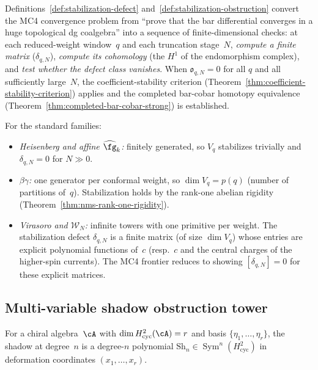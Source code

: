 \begin{remark}
\label{rem:nms-mc4-finite-linear-algebra}%
%
Definitions~\ref{def:stabilization-defect}
and~\ref{def:stabilization-obstruction} convert the MC4 convergence
problem from ``prove that the bar differential converges in a huge
topological dg coalgebra'' into a sequence of finite-dimensional
checks: at each reduced-weight window~$q$ and each truncation
stage~$N$, \emph{compute a finite matrix} ($\delta_{q,N}$),
\emph{compute its cohomology} (the $H^1$ of the endomorphism
complex), and \emph{test whether the defect class vanishes}. When
$\mathfrak{o}_{q,N} = 0$ for all $q$ and all sufficiently large~$N$,
the coefficient-stability criterion
(Theorem~\ref{thm:coefficient-stability-criterion}) applies and the
completed bar-cobar homotopy equivalence
(Theorem~\ref{thm:completed-bar-cobar-strong}) is established.

For the standard families:
\begin{itemize}
\item \emph{Heisenberg and affine $\widehat{\fg}_k$:} finitely
 generated, so $V_q$ stabilizes trivially and
 $\delta_{q,N} = 0$ for $N \gg 0$.
\item \emph{$\beta\gamma$:} one generator per conformal weight,
 so $\dim V_q = p(q)$ (number of partitions of~$q$).
 Stabilization holds by the rank-one abelian rigidity
 (Theorem~\ref{thm:nms-rank-one-rigidity}).
\item \emph{Virasoro and $\mathcal{W}_N$:} infinite towers with
 one primitive per weight. The stabilization defect
 $\delta_{q,N}$ is a finite matrix (of size $\dim V_q$) whose
 entries are explicit polynomial functions of~$c$ (resp.\ $c$
 and the central charges of the higher-spin currents). The
 MC4 frontier reduces to showing $[\delta_{q,N}] = 0$ for these
 explicit matrices.
\end{itemize}
\end{remark}


\subsection{Multi-variable shadow obstruction tower}\label{sec:nms-multivariable-shadow}

For a chiral algebra~$\cA$ with $\dim H^2_{\mathrm{cyc}}(\cA) = r$ and
basis $\{\eta_1, \ldots, \eta_r\}$, the shadow at degree~$n$ is a
degree-$n$ polynomial
$\mathrm{Sh}_n \in \operatorname{Sym}^n(H^2_{\mathrm{cyc}})$ in
deformation coordinates $(x_1, \ldots, x_r)$.

